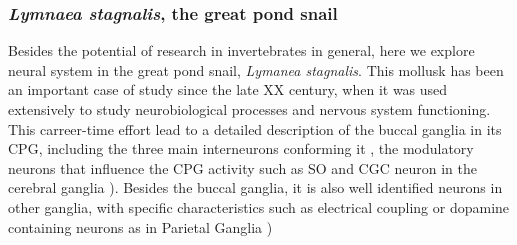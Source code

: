 \subsubsection{\textit{Lymnaea stagnalis}, the great pond snail}
Besides the potential of research in invertebrates in general, here we explore neural system in the great pond snail, \textit{Lymanea stagnalis}. This mollusk has been an important case of study since the late XX century, when it was used extensively to study neurobiological processes and nervous system functioning. This carreer-time effort lead to a detailed description of the buccal ganglia 
in its CPG, including the three main interneurons conforming it \parencite{benjamin_snail_1989,benjamin_morphology_1979,rose_relationship_1979,brierley_behavioral_1997}, the modulatory neurons that influence the CPG activity such as SO and CGC neuron in the cerebral ganglia \parencite{rose_interneuronal_1981,mccrohan_patterns_1980,kemenes_multiple_2001}). Besides the buccal ganglia, it is also well identified neurons in other ganglia, with specific characteristics such as electrical coupling or dopamine containing neurons as in Parietal Ganglia \parencite{benjamin_electrotonic_1986,winlow_multiple_1981})

